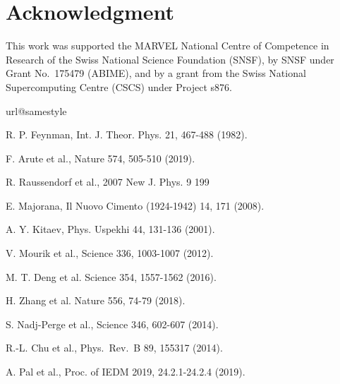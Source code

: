 \documentclass[10pt,usletter,conference]{IEEEtran}
\begin{document}
\section*{Acknowledgment}
This work was supported the MARVEL National  Centre  of  Competence
in  Research  of  the  Swiss  National Science Foundation (SNSF), by
SNSF under Grant No.~175479 (ABIME), and by a grant from the Swiss
National Supercomputing Centre (CSCS) under Project s876.


%
\begin{thebibliography}{10}
\providecommand{\url}[1]{#1}
\csname url@samestyle\endcsname
\providecommand{\newblock}{\relax}
\providecommand{\bibinfo}[2]{#2}
\providecommand{\BIBentrySTDinterwordspacing}{\spaceskip=0pt\relax}
\providecommand{\BIBentryALTinterwordstretchfactor}{4}
\providecommand{\BIBentryALTinterwordspacing}{\spaceskip=\fontdimen2\font plus
\BIBentryALTinterwordstretchfactor\fontdimen3\font minus
  \fontdimen4\font\relax}
\providecommand{\BIBforeignlanguage}[2]{{%
\expandafter\ifx\csname l@#1\endcsname\relax
\typeout{** WARNING: IEEEtran.bst: No hyphenation pattern has been}%
\typeout{** loaded for the language `#1'. Using the pattern for}%
\typeout{** the default language instead.}%
\else
\language=\csname l@#1\endcsname
\fi
#2}}
\providecommand{\BIBdecl}{\relax}
\BIBdecl

R. P. Feynman, Int. J. Theor. Phys. 21, 467-488 (1982).

F. Arute et al., Nature 574, 505-510 (2019).

R. Raussendorf et al., 2007 New J. Phys. 9 199
 
E. Majorana, Il Nuovo Cimento (1924-1942) 14, 171 (2008).

A. Y. Kitaev, Phys. Uspekhi 44, 131-136 (2001).

V. Mourik et al., Science 336, 1003-1007 (2012).

M. T. Deng et al. Science 354, 1557-1562 (2016).

H. Zhang et al. Nature 556, 74-79 (2018).

S. Nadj-Perge et al., Science 346, 602-607 (2014).

R.-L. Chu et al., Phys.~Rev.~B 89, 155317 (2014).

A. Pal et al., Proc. of IEDM 2019, 24.2.1-24.2.4 (2019).


\end{thebibliography}
\end{document}
